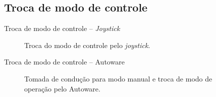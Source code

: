 \documentclass{if-beamer}
\begin{document}
\subsection*{Troca de modo de controle}

\begin{frame}{Troca de modo de controle -- \textit{Joystick}}
	
	\begin{figure}[H]
		\centering
		\caption{Troca do modo de controle pelo \textit{joystick}.}
		\label{fig:microautoware_testing_autonomous_w_control_mode_change}
	\end{figure}
		
\end{frame}

\begin{frame}{Troca de modo de controle -- Autoware}
	
	\begin{figure}[H]
		\centering
		\caption{Tomada de condução para modo manual e troca de modo de operação pelo Autoware.}
		\label{fig:microautoware_testing_autonomous_w_manual_mode_take_up}
	\end{figure}
\end{frame}
\end{document}

